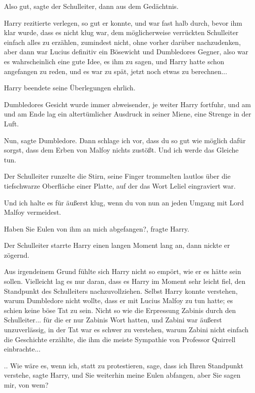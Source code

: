 \glqq{}Also gut\grqq{}, sagte der Schulleiter, \glqq{}dann aus dem
Gedächtnis.\grqq{}

Harry rezitierte verlegen, so gut er konnte, und war fast halb durch, bevor ihm
klar wurde, dass es nicht klug war, dem möglicherweise verrückten Schulleiter
einfach alles zu erzählen, zumindest nicht, ohne vorher darüber nachzudenken,
aber dann war Lucius definitiv ein Bösewicht und Dumbledores Gegner, also war es
wahrscheinlich eine gute Idee, es ihm zu sagen, und Harry hatte schon angefangen
zu reden, und es war zu spät, jetzt noch etwas zu berechnen...

Harry beendete seine Überlegungen ehrlich.

Dumbledores Gesicht wurde immer abweisender, je weiter Harry fortfuhr, und am
und am Ende lag ein altertümlicher Ausdruck in seiner Miene, eine Strenge in der
Luft.

\glqq{}Nun\grqq{}, sagte Dumbledore. \glqq{}Dann schlage ich vor, dass du so gut
wie möglich dafür sorgst, dass dem Erben von Malfoy nichts zustößt. Und ich
werde das Gleiche tun.\grqq{}

Der Schulleiter runzelte die Stirn, seine Finger trommelten lautlos über die
tiefschwarze Oberfläche einer Platte, auf der das Wort Leliel eingraviert war.

\glqq{}Und ich halte es für äußerst klug, wenn du von nun an jeden Umgang mit
Lord Malfoy vermeidest.\grqq{}

\glqq{}Haben Sie Eulen von ihm an mich abgefangen?\grqq{}, fragte Harry.

Der Schulleiter starrte Harry einen langen Moment lang an, dann nickte er
zögernd.

Aus irgendeinem Grund fühlte sich Harry nicht so empört, wie er es hätte sein
sollen. Vielleicht lag es nur daran, dass es Harry im Moment sehr leicht fiel,
den Standpunkt des Schulleiters nachzuvollziehen. Selbst Harry konnte verstehen,
warum Dumbledore nicht wollte, dass er mit Lucius Malfoy zu tun hatte; es schien
keine böse Tat zu sein. Nicht so wie die Erpressung Zabinis durch den
Schulleiter... für die er nur Zabinis Wort hatten, und Zabini war äußerst
unzuverlässig, in der Tat war es schwer zu verstehen, warum Zabini nicht einfach
die Geschichte erzählte, die ihm die meiste Sympathie von Professor Quirrell
einbrachte...

.. \glqq{}Wie wäre es, wenn ich, statt zu protestieren, sage, dass ich Ihren
Standpunkt verstehe\grqq{}, sagte Harry, \glqq{}und Sie weiterhin meine Eulen
abfangen, aber Sie sagen mir, von wem?\grqq{}

